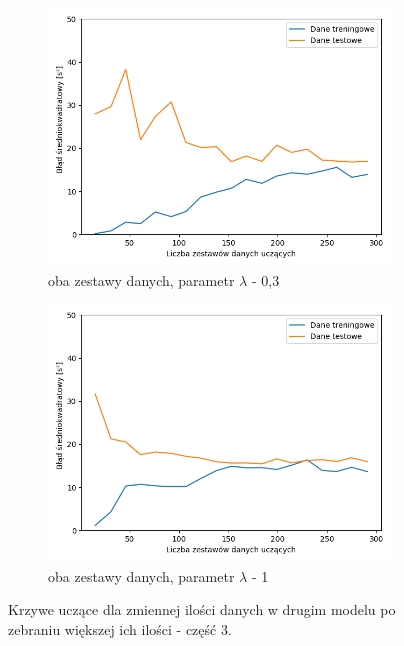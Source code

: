 \documentclass[12pt]{aghdpl}
\begin{document}
		\begin{figure}[h]
			\centering
		 	\begin{subfigure}{.8\linewidth}
		 		\includegraphics[width =\linewidth]{wykresy/8_zebranie_wiekszej_ilosci_danych/0-400/regularyzacja_0_3_learning_curves.png}
		 		\caption{oba zestawy danych, parametr $\lambda$ - 0,3}
		 	\end{subfigure}
		 	\begin{subfigure}{.8\linewidth}
		 		\includegraphics[width =\linewidth]{wykresy/8_zebranie_wiekszej_ilosci_danych/0-400/regularyzacja_1_learning_curves.png}
		 		\caption{oba zestawy danych, parametr $\lambda$ - 1}
		 	\end{subfigure}
	 	
 			\caption{Krzywe uczące dla zmiennej ilości danych w drugim modelu po zebraniu większej ich ilości - część 3.}
			\label{fig: drugi_model_po_zebraniu_wiekszej_ilosci_danych_learning_curves_3}
		\end{figure}
		
\end{document}

